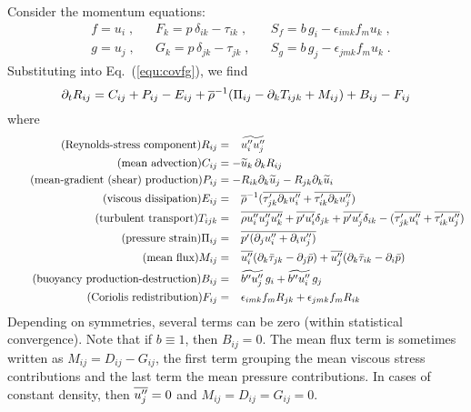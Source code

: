 Consider the momentum equations:
\begin{align}
  &f = u_i\;, && F_k=p\,\delta_{ik}-\tau_{ik}\;, && S_f = b\, g_i- \epsilon_{imk} f_m u_k\;,\\
  &g = u_j\;, && G_k=p\,\delta_{jk}-\tau_{jk}\;, && S_g = b\, g_j- \epsilon_{jmk} f_m u_k\;.
\end{align}
Substituting into Eq.~(\ref{equ:covfg}), we find
\begin{equation}\label{equ:Rij}
  \pt{R_{ij}}{t}  = C_{ij}  +P_{ij} -E_{ij}
  +\avr{\rho}^{-1} ( \Pi_{ij} - \pt{T_{ijk}}{k} + M_{ij} ) +B_{ij} -F_{ij}
\end{equation}
where
\begin{align}
  \tag{Reynolds-stress component}
    R_{ij}  &=\phantom{-}\avf{u_i''u_j''}\\
  \tag{mean advection}
    C_{ij}  &=-\avf{u}_k\,\pt{R_{ij}}{k}\\
  \tag{mean-gradient (shear) production}
    P_{ij}  &=-R_{ik} \pt{\avf{u}_j}{k} -R_{jk} \pt{\avf{u}_i}{k} \\
  \tag{viscous dissipation}
    E_{ij}  &=\phantom{-} \avr{\rho}^{-1} ( \avr{\tau'_{jk} \pt{u''_i}{k}}
                                           +\avr{\tau'_{ik} \pt{u''_j}{k}} )\\
  \tag{turbulent transport}
    T_{ijk} &=\phantom{-} \avr{\rho u''_i u''_j u''_k}
                         +\avr{p'u'_i}\delta_{jk} +\avr{p'u'_j}\delta_{ik}
                         -( \avr{\tau'_{jk} u''_i} +\avr{\tau'_{ik} u''_j} )\\
  \tag{pressure strain}
    \Pi_{ij}&=\phantom{-} \avr{ p' ( \pt{u''_i}{j}+ \pt{u''_j}{i} ) }\\
  \tag{mean flux}
    M_{ij}  &=\phantom{-} \avr{u''_i} ( \pt{\bar{\tau}_{jk}}{k} - \pt{\bar{p}}{j} )
                         +\avr{u''_j} ( \pt{\bar{\tau}_{ik}}{k} - \pt{\bar{p}}{i} )\\
  \tag{buoyancy production-destruction}
    B_{ij}  &=\phantom{-} \avf{b''u''_j}\,g_i+\avf{b''u''_i}\,g_j \\
  \tag{Coriolis redistribution}
    F_{ij}  &=\phantom{-} \epsilon_{imk}f_m R_{jk} +\epsilon_{jmk}f_m R_{ik}
\end{align}
Depending on symmetries, several terms can be zero (within statistical convergence). Note that if $b\equiv 1$, then $B_{ij}=0$. The mean flux term is sometimes written as $M_{ij}=D_{ij}-G_{ij}$, the first term grouping the mean viscous stress contributions and the last term the mean pressure contributions. In cases of constant density, then $\avr{u''_j}=0$ and $M_{ij}=D_{ij}=G_{ij}=0$.

